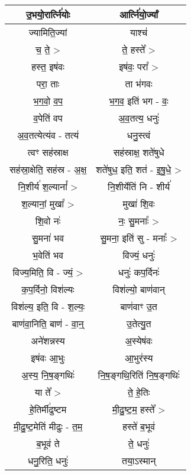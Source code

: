 {\begin{longtable}{|c|c|}
\hline
उ॒भयो॒रार्त्नि॑योः            & आर्त्नि॑यो॒र्ज्यां\\
\hline
ज्यामिति॒ज्यां               & याश्च॑\\
\hline
च॒ ते॒ >                    & ते॒ हस्ते᳚ >\\
\hline
हस्त॒ इष॑वः                 & इष॑वः॒ परा᳚ >\\
\hline
परा॒ ताः                  & ता भ॑गवः\\
\hline
भ॒ग॒वो॒ व॒प॒                  & भ॒ग॒व॒ इति॑ भग - वः॒\\
\hline
व॒पेति॑ वप                  & अ॒व॒तत्य॒ धनुः॑\\
\hline
अ॒व॒तत्येत्य॑व - तत्य॑           & धनु॒स्त्वं\\
\hline
त्वꣳ सह॑स्राक्ष              & सह॑स्राक्ष॒ शते॑षुधे\\
\hline
सह॑स्रा॒क्षेति॒ सह॑स्र - अ॒क्ष॒     & शते॑षुध॒ इति॒ शत॑ - इ॒षु॒धे॒ >\\
\hline
नि॒शीर्य॑ श॒ल्यानां᳚ >          & नि॒शीर्येति॑ नि - शीर्य॑\\
\hline
श॒ल्यानां॒ मुखा᳚ >             & मुखा॑ शि॒वः\\
\hline
शि॒वो नः॑                  & नः॒ सु॒मनाः᳚ >\\
\hline
सु॒मना॑ भव                  & सु॒मना॒ इति॑ सु - मनाः᳚ >\\
\hline
भ॒वेति॑ भव                  & विज्यं॒ धनुः॑\\
\hline
विज्य॒मिति॒ वि - ज्यं॒ >       & धनुः॑ कप॒र्दिनः॑\\
\hline
क॒प॒र्दिनो॒ विश॑ल्यः           & विश॑ल्यो॒ बाण॑वान्\\
\hline
विश॑ल्य॒ इति॒ वि - श॒ल्यः॒      & बाण॑वाꣳ उ॒त\\
\hline
बाण॑वा॒निति॒ बाण॑ - वा॒न्॒      & उ॒तेत्यु॒त\\
\hline
अने॑शन्नस्य                  & अ॒स्येष॑वः\\
\hline
इष॑वः आ॒भुः                 & आ॒भुर॑स्य\\
\hline
अ॒स्य॒ नि॒ष॒ङ्गथिः॑             & नि॒ष॒ङ्गथि॒रिति॑ नि॒ष॒ङ्गथिः॑\\
\hline
या ते᳚ >                   & ते॒ हे॒तिः\\
\hline
हे॒तिर्मी॑ढुष्टम               & मी॒ढु॒ष्ट॒म॒ हस्ते᳚ >\\
\hline
मी॒ढु॒ष्ट॒मेति॑ मीढुः - त॒म॒       & हस्ते॑ ब॒भूव॑\\
\hline
ब॒भूव॑ ते                    & ते॒ धनुः॑\\
\hline
धनु॒रिति॒ धनुः॑               & तया॒ऽस्मान्\\

\end{longtable}}
